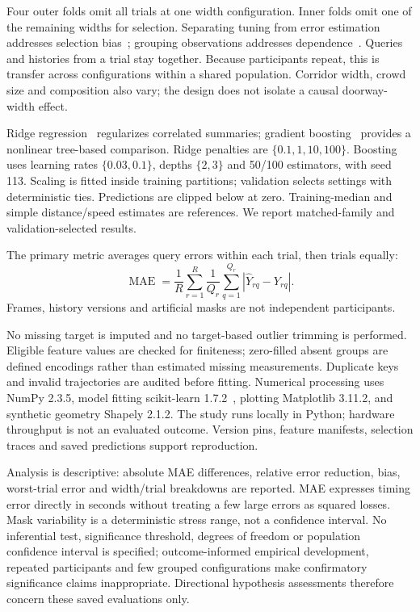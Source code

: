 \documentclass[conference]{IEEEtran}
\begin{document}
Four outer folds omit all trials at one width configuration. Inner folds omit one of the remaining widths for selection. Separating tuning from error estimation addresses selection bias~\cite{varma}; grouping observations addresses dependence~\cite{roberts}. Queries and histories from a trial stay together. Because participants repeat, this is transfer across configurations within a shared population. Corridor width, crowd size and composition also vary; the design does not isolate a causal doorway-width effect.

Ridge regression~\cite{hoerl} regularizes correlated summaries; gradient boosting~\cite{friedman} provides a nonlinear tree-based comparison. Ridge penalties are $\{0.1,1,10,100\}$. Boosting uses learning rates $\{0.03,0.1\}$, depths $\{2,3\}$ and 50/100 estimators, with seed 113. Scaling is fitted inside training partitions; validation selects settings with deterministic ties. Predictions are clipped below at zero. Training-median and simple distance/speed estimates are references. We report matched-family and validation-selected results.

The primary metric averages query errors within each trial, then trials equally:
\begin{equation}\operatorname{MAE}=\frac1R\sum_{r=1}^R\frac1{Q_r}\sum_{q=1}^{Q_r}|\widehat Y_{rq}-Y_{rq}|.\end{equation}
Frames, history versions and artificial masks are not independent participants.

No missing target is imputed and no target-based outlier trimming is performed. Eligible feature values are checked for finiteness; zero-filled absent groups are defined encodings rather than estimated missing measurements. Duplicate keys and invalid trajectories are audited before fitting. Numerical processing uses NumPy 2.3.5, model fitting scikit-learn 1.7.2~\cite{sklearn}, plotting Matplotlib 3.11.2, and synthetic geometry Shapely 2.1.2. The study runs locally in Python; hardware throughput is not an evaluated outcome. Version pins, feature manifests, selection traces and saved predictions support reproduction.

Analysis is descriptive: absolute MAE differences, relative error reduction, bias, worst-trial error and width/trial breakdowns are reported. MAE expresses timing error directly in seconds without treating a few large errors as squared losses. Mask variability is a deterministic stress range, not a confidence interval. No inferential test, significance threshold, degrees of freedom or population confidence interval is specified; outcome-informed empirical development, repeated participants and few grouped configurations make confirmatory significance claims inappropriate. Directional hypothesis assessments therefore concern these saved evaluations only.
\end{document}
